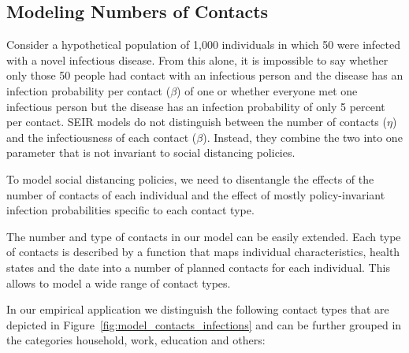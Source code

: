 \subsection{Modeling Numbers of Contacts}
\label{sec:number_of_contacts}

Consider a hypothetical population of 1,000 individuals in which 50 were infected with a
novel infectious disease. From this alone, it is impossible to say whether only those 50
people had contact with an infectious person and the disease has an infection probability
per contact ($\beta$) of one or whether everyone met one infectious person but the
disease has an infection probability of only 5 percent per contact. SEIR models do not
distinguish between the number of contacts ($\eta$) and the infectiousness of each
contact ($\beta$). Instead, they combine the two into one parameter that is not invariant
to social distancing policies.

To model social distancing policies, we need to disentangle the effects of the number of
contacts of each individual and the effect of mostly policy-invariant infection
probabilities specific to each contact type.

The number and type of contacts in our model can be easily extended. Each type of
contacts is described by a function that maps individual characteristics, health states
and the date into a number of planned contacts for each individual. This allows to model
a wide range of contact types.

In our empirical application we distinguish the following  contact types that
are depicted in Figure~\ref{fig:model_contacts_infections} and can be further grouped
in the categories household, work, education and others:

